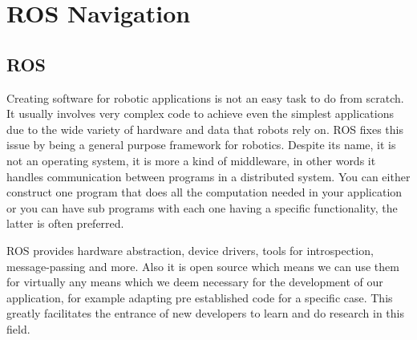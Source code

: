 \chapter{ROS Navigation} \label{ch:BaseWork}

\section {ROS}
Creating software for robotic applications is not an easy task to do from scratch. It usually involves very complex code to achieve even the simplest applications due to the wide variety of hardware and data that robots rely on. \ac{ROS} \cite{ros} fixes this issue by being a general purpose framework for robotics. Despite its name, it is not an operating system, it is more a kind of middleware, in other words it  handles communication between programs in a distributed system. You can either construct one program that does all the computation needed in your application or you can have sub programs with each one having a specific functionality, the latter is often preferred.

\ac{ROS} provides hardware abstraction, device drivers, tools for introspection, message-passing and more. Also it is open source which means we can use them for virtually any means which we deem necessary for the development of our application, for example adapting pre established code for a specific case. This greatly facilitates the entrance of new developers to learn and do research in this field.
